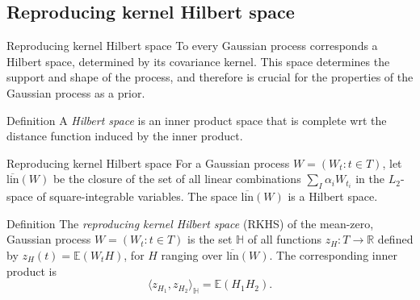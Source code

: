 \subsection{Reproducing kernel Hilbert space}

\begin{frame}{Reproducing kernel Hilbert space}
	To every Gaussian process corresponds a Hilbert space, determined by its covariance kernel. This space determines the support and shape of the process, and therefore is crucial for the properties of the Gaussian process as a prior. 

\pause

\begin{block}{Definition}
	A \textit{Hilbert space} is an inner product space that is complete wrt the distance function induced by the inner product.
\end{block}
\end{frame}


\begin{frame}{Reproducing kernel Hilbert space}
For a Gaussian process $W = (W_t : t \in T)$, let $\overline{\text{lin}}(W)$ be the closure of the set of all linear combinations $\sum_I \alpha_i W_{t_i}$ in the $L_2$-space of square-integrable variables. The space $\overline{\text{lin}}(W)$ is a Hilbert space.

\pause

\begin{block}{Definition} 
The \textit{reproducing kernel Hilbert space} (RKHS) of the mean-zero, Gaussian process $W = (W_t : t \in T )$ is the set $\mathbb{H}$ of all functions $z_H:T \to \mathbb{R}$ defined by $z_H(t) = \mathbb{E}(W_t H)$, for $H$ ranging over $\overline{\text{lin}}(W)$. The corresponding inner product is
	$$\langle z_{H_1},z_{H_2}\rangle_{\mathbb{H}} =  \mathbb{E}(H_1H_2).$$
\end{block}
\end{frame}


